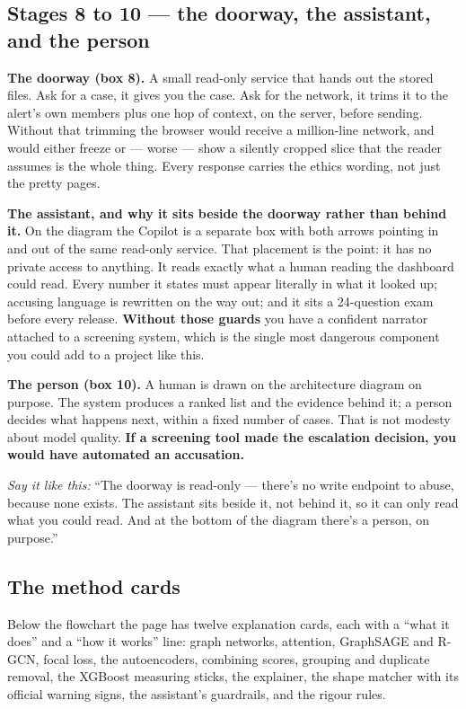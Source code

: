 \documentclass[11pt,a4paper]{article}
\newcommand{\aloud}[1]{\par\smallskip\noindent\textit{\textcolor{accent}{Say
it like this:}} ``#1''\par\smallskip}
\begin{document}
\subsection{Stages 8 to 10 --- the doorway, the assistant, and the person}

\textbf{The doorway (box 8).} A small read-only service that hands out the
stored files. Ask for a case, it gives you the case. Ask for the network, it
trims it to the alert's own members plus one hop of context, on the server,
before sending. Without that trimming the browser would receive a
million-line network, and would either freeze or --- worse --- show a silently
cropped slice that the reader assumes is the whole thing. Every response
carries the ethics wording, not just the pretty pages.

\textbf{The assistant, and why it sits beside the doorway rather than behind
it.} On the diagram the Copilot is a separate box with both arrows pointing in
and out of the same read-only service. That placement is the point: it has no
private access to anything. It reads exactly what a human reading the dashboard
could read. Every number it states must appear literally in what it looked up;
accusing language is rewritten on the way out; and it sits a 24-question exam
before every release. \textbf{Without those guards} you have a confident
narrator attached to a screening system, which is the single most dangerous
component you could add to a project like this.

\textbf{The person (box 10).} A human is drawn on the architecture diagram on
purpose. The system produces a ranked list and the evidence behind it; a person
decides what happens next, within a fixed number of cases. That is not modesty
about model quality. \textbf{If a screening tool made the escalation decision,
you would have automated an accusation.}

\aloud{The doorway is read-only --- there's no write endpoint to abuse, because
none exists. The assistant sits beside it, not behind it, so it can only read
what you could read. And at the bottom of the diagram there's a person, on
purpose.}

\subsection{The method cards}

Below the flowchart the page has twelve explanation cards, each with a ``what
it does'' and a ``how it works'' line: graph networks, attention, GraphSAGE and
R-GCN, focal loss, the autoencoders, combining scores, grouping and duplicate
removal, the XGBoost measuring sticks, the explainer, the shape matcher with
its official warning signs, the assistant's guardrails, and the rigour rules.
\end{document}
